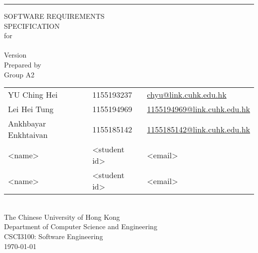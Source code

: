 \documentclass[a4paper, 11pt]{scrreprt}
\begin{document}

\begin{titlepage}
    \begin{flushright}
        \rule{\textwidth}{5pt}\vskip1cm
        \begin{bfseries}
            \Huge{SOFTWARE REQUIREMENTS\\ SPECIFICATION}\\
            \vspace{1.6cm}
            for\\
            \vspace{1.6cm}
            \projectname\\  %
            \vspace{1.6cm}
            \LARGE{Version \myversion}\\
            \vspace{1.6cm}
            Prepared by\\
            Group A2\\
            \Large{
                \begin{tabularx}{\textwidth}{l l >{\raggedleft\arraybackslash}X}
                    YU Ching Hei & 1155193237 & \href{mailto:chyu@link.cuhk.edu.hk}{chyu@link.cuhk.edu.hk}\\
                    Lei Hei Tung & 1155194969 & \href{mailto:1155194969@link.cuhk.edu.hk}{1155194969@link.cuhk.edu.hk}\\
                    Ankhbayar Enkhtaivan & 1155185142 & \href{mailto:1155185142@link.cuhk.edu.hk}{1155185142@link.cuhk.edu.hk}\\
                    <name> & <student id> & <email>\\
                    <name> & <student id> & <email>\\
                \end{tabularx}
            }\\
            \vspace{1.6cm}
            The Chinese University of Hong Kong\\
            Department of Computer Science and Engineering\\
            CSCI3100: Software Engineering\\
            \vspace{1.6cm}
            \today\\
        \end{bfseries}
    \end{flushright}
\end{titlepage}
\end{document}
